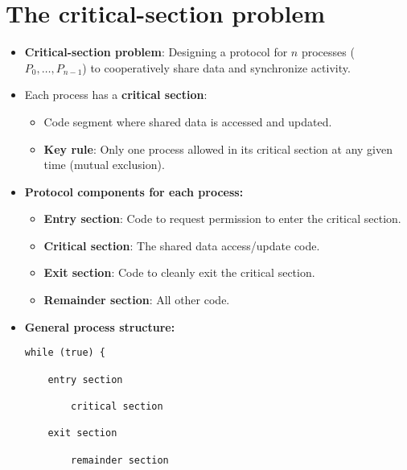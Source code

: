 \section{The critical-section problem}
\begin{itemize}
    \item \textbf{Critical-section problem}: Designing a protocol for $n$ processes ($P_0, \dots, P_{n-1}$) to cooperatively share data and synchronize activity.
    \item Each process has a \textbf{critical section}:
    \begin{itemize}
        \item Code segment where shared data is accessed and updated.
        \item \textbf{Key rule}: Only one process allowed in its critical section at any given time (mutual exclusion).
    \end{itemize}
    \item \textbf{Protocol components for each process:}
    \begin{itemize}
        \item \textbf{Entry section}: Code to request permission to enter the critical section.
        \item \textbf{Critical section}: The shared data access/update code.
        \item \textbf{Exit section}: Code to cleanly exit the critical section.
        \item \textbf{Remainder section}: All other code.
    \end{itemize}
    \item \textbf{General process structure:}
\begin{verbatim}
while (true) {
 
    entry section
 
        critical section
 
    exit section
 
        remainder section
 

\end{verbatim}
\end{itemize}
